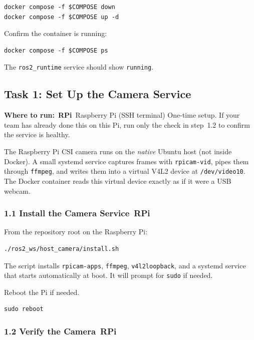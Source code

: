 \documentclass{ol-softwaremanual}
\newcommand{\onrpi}{%
  \,\colorbox{blue!20}{\footnotesize\sffamily\bfseries RPi}}
\newcommand{\machinebox}[2]{%
  \par\noindent
  \colorbox{gray!12}{\parbox{\dimexpr\linewidth-2\fboxsep}{%
    \small\sffamily\textbf{Where to run:} #1 \quad\textbar\quad #2}}%
  \par\smallskip}
\begin{document}
\begin{verbatim}
docker compose -f $COMPOSE down
docker compose -f $COMPOSE up -d
\end{verbatim}

Confirm the container is running:

\begin{verbatim}
docker compose -f $COMPOSE ps
\end{verbatim}

The \texttt{ros2\_runtime} service should show \texttt{running}.


\subsection{Task 1: Set Up the Camera Service}

\machinebox{\onrpi\ Raspberry Pi (SSH terminal)}{One-time setup. If your team has already done this on this Pi, run only the check in step~1.2 to confirm the service is healthy.}

The Raspberry Pi CSI camera runs on the \emph{native} Ubuntu host (not inside
Docker).
A small systemd service captures frames with \texttt{rpicam-vid}, pipes them
through \texttt{ffmpeg}, and writes them into a virtual V4L2 device at
\texttt{/dev/video10}.
The Docker container reads this virtual device exactly as if it were a USB
webcam.

\subsubsection*{1.1 Install the Camera Service\onrpi}

From the repository root on the Raspberry Pi:

\begin{verbatim}
./ros2_ws/host_camera/install.sh
\end{verbatim}

The script installs \texttt{rpicam-apps}, \texttt{ffmpeg},
\texttt{v4l2loopback}, and a systemd service that starts automatically at boot.
It will prompt for \texttt{sudo} if needed.

Reboot the Pi if needed. 
\begin{verbatim}
sudo reboot
\end{verbatim}

\subsubsection*{1.2 Verify the Camera\onrpi}
\end{document}
